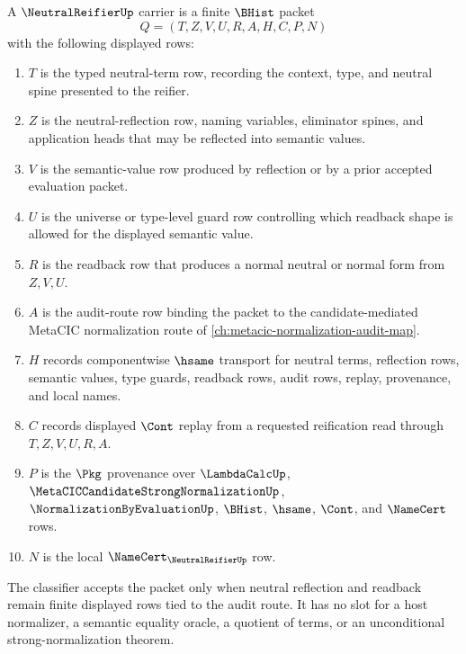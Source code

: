 \begin{definition}
\label{def:neutral-reifier-carrier}
A $\NeutralReifierUp$ carrier is a finite $\BHist$ packet
$$
Q=(T,Z,V,U,R,A,H,C,P,N)
$$
with the following displayed rows:
\begin{enumerate}
\item $T$ is the typed neutral-term row, recording the context, type, and neutral spine presented to the reifier.
\item $Z$ is the neutral-reflection row, naming variables, eliminator spines, and application heads that may be reflected into semantic values.
\item $V$ is the semantic-value row produced by reflection or by a prior accepted evaluation packet.
\item $U$ is the universe or type-level guard row controlling which readback shape is allowed for the displayed semantic value.
\item $R$ is the readback row that produces a normal neutral or normal form from $Z,V,U$.
\item $A$ is the audit-route row binding the packet to the candidate-mediated MetaCIC normalization route of \autoref{ch:metacic-normalization-audit-map}.
\item $H$ records componentwise $\hsame$ transport for neutral terms, reflection rows, semantic values, type guards, readback rows, audit rows, replay, provenance, and local names.
\item $C$ records displayed $\Cont$ replay from a requested reification read through $T,Z,V,U,R,A$.
\item $P$ is the $\Pkg$ provenance over $\LambdaCalcUp$, $\MetaCICCandidateStrongNormalizationUp$, $\NormalizationByEvaluationUp$, $\BHist$, $\hsame$, $\Cont$, and $\NameCert$ rows.
\item $N$ is the local $\NameCert_{\NeutralReifierUp}$ row.
\end{enumerate}
The classifier accepts the packet only when neutral reflection and readback remain finite displayed rows tied to the audit route. It has no slot for a host normalizer, a semantic equality oracle, a quotient of terms, or an unconditional strong-normalization theorem.
\end{definition}

